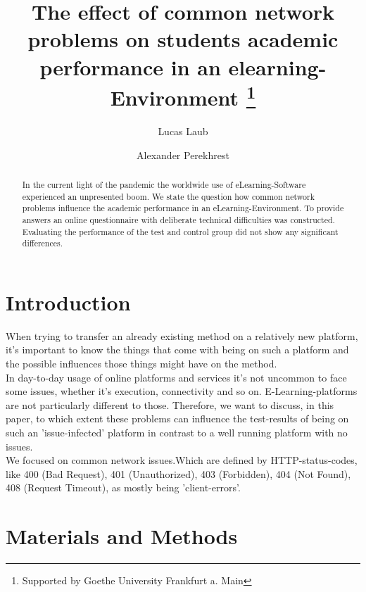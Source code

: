 \documentclass[runningheads]{llncs}
\begin{document}
\title{The effect of common network problems on students academic performance in an elearning-Environment
\thanks{Supported by Goethe University Frankfurt a. Main}}

\author{Lucas Laub \and
Alexander Perekhrest }


\maketitle


\begin{abstract}
In the current light of the pandemic the worldwide use
of eLearning-Software experienced an unpresented boom.
We state the question how common network problems influence
the academic performance in an eLearning-Environment.
To provide answers an online questionnaire with deliberate
technical difficulties was constructed. Evaluating the performance
of the test and control group did not show any significant
differences.
\end{abstract}

\section{Introduction}
When trying to transfer an already existing method on a relatively new platform, 
it's important to know the things that come with being on such a platform and the 
possible influences those things might have on the method.\\

In day-to-day usage of online platforms and services it's not uncommon to face some 
issues, whether it's execution, connectivity and so on. E-Learning-platforms are not 
particularly different to those. Therefore, we want to discuss, in this paper, to 
which extent these problems can influence the test-results of being on such an 
'issue-infected' platform in contrast to a well running platform with no issues.\\

We focused on common network issues.Which are defined by HTTP-status-codes, like 400 (Bad Request), 401 
(Unauthorized), 403 (Forbidden), 404 (Not Found), 408 (Request Timeout), as mostly being 'client-errors'.
\section{Materials and Methods}
\end{document}
